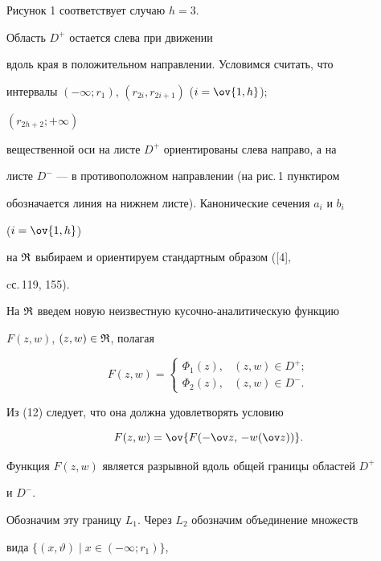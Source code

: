 Рисунок 1 соответствует случаю $h=3$. 


Область $D^+$ остается слева при движении 


вдоль края в положительном направлении. Условимся считать, что 


интервалы $(-\infty;r_1)$, $(r_{2i},r_{2i+1})$ ($i=\ov{1,h}$); 


$(r_{2h+2};+\infty)$ 


вещественной оси на листе $D^+$ ориентированы слева направо, а на 


листе $D^-$ --- в противоположном направлении (на рис.\,1 пунктиром 


обозначается линия на нижнем листе). Канонические сечения $a_i$ и $b_i$ 


($i=\ov{1,h}$) 


на $\frak R$ выбираем и ориентируем стандартным образом ([4], 


cс.\,119, 155). 


 


На $\frak R$ введем новую неизвестную кусочно-аналитическую функцию 


$F(z,w)$, $(z,w)\in\frak R$, полагая 


\begin{equation} 


F(z,w)= 


\begin{cases} 


\Phi_1(z), & (z,w)\in D^+; \\ 


\Phi_2(z), & (z,w)\in D^-. 


\end{cases} 


\end{equation} 


Из (12) следует, что она должна удовлетворять условию 


\begin{equation} 


F(z,w)=\ov{F(-\ov z,\,-w(\ov z))}. 


\end{equation} 


Функция $F(z,w)$ является разрывной вдоль общей границы областей $D^+$ 


и $D^-$. 


Обозначим эту границу $L_1$. Через $L_2$ обозначим объединение множеств 


вида $\{(x,\vartheta)\mid x\in(-\infty;r_1)\}$, 



